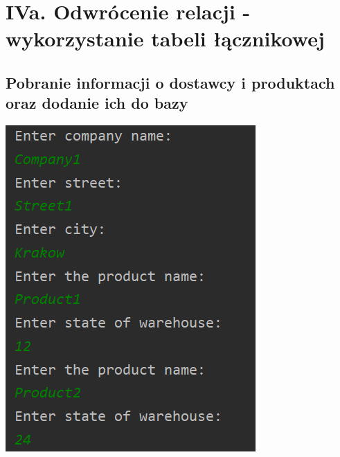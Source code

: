 \documentclass[a4paper, 11pt]{article}
\begin{document}
    \newpage



    \section{IVa. Odwrócenie relacji - wykorzystanie tabeli łącznikowej}

    \subsection{Pobranie informacji o dostawcy i produktach oraz dodanie ich do bazy}
    \begin{center}
        \includegraphics[scale=1.3]{images/point4_additional_table/addSupplierAndProducts.png}
    \end{center}
\end{document}
